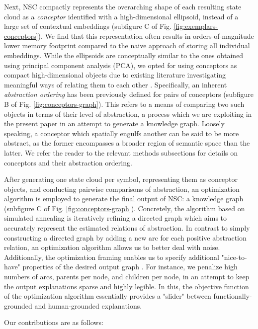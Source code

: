 Next, NSC compactly represents the overarching shape of each resulting state cloud as a \textit{conceptor} identified with a high-dimensional ellipsoid, instead of a large set of contextual embeddings \citep{jaeger_controlling_2017} (subfigure C of Fig. \ref{fig:exemplars-conceptors}). We find that this representation often results in orders-of-magnitude lower memory footprint compared to the naive approach of storing all individual embeddings. While the ellipsoids are conceptually similar to the ones obtained using principal component analysis (PCA), we opted for using conceptors as compact high-dimensional objects due to existing literature investigating meaningful ways of relating them to each other \citep{jaeger_controlling_2017}. Specifically, an inherent \textit{abstraction ordering} has been previously defined for pairs of conceptors (subfigure B of Fig. \ref{fig:conceptors-graph}). This refers to a means of comparing two such objects in terms of their level of abstraction, a process which we are exploiting in the present paper in an attempt to generate a knowledge graph. Loosely speaking, a conceptor which spatially engulfs another can be said to be more abstract, as the former encompasses a broader region of semantic space than the latter. We refer the reader to the relevant methods subsections for details on conceptors and their abstraction ordering.

After generating one state cloud per symbol, representing them as conceptor objects, and conducting pairwise comparisons of abstraction, an optimization algorithm is employed to generate the final output of NSC: a knowledge graph (subfigure C of Fig. \ref{fig:conceptors-graph}). Concretely, the algorithm based on simulated annealing is iteratively refining a directed graph which aims to accurately represent the estimated relations of abstraction. In contrast to simply constructing a directed graph by adding a new arc for each positive abstraction relation, an optimization algorithm allows us to better deal with noise. Additionally, the optimization framing enables us to specify additional "nice-to-have" properties of the desired output graph \citep{madsen_post-hoc_2021}. For instance, we penalize high numbers of arcs, parents per node, and children per node, in an attempt to keep the output explanations sparse and highly legible. In this, the objective function of the optimization algorithm essentially provides a "slider" between functionally-grounded and human-grounded explanations.

Our contributions are as follows:

